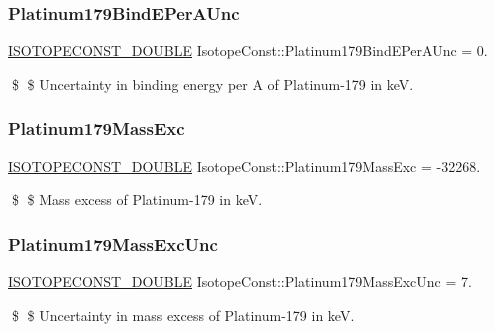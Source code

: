\subsubsection{\texorpdfstring{Platinum179\+Bind\+E\+Per\+A\+Unc}{Platinum179BindEPerAUnc}}
{\footnotesize\ttfamily \mbox{\hyperlink{group___isotope_const-_macros_ga8f45a7272ce02c0b4c65c44636ed719a}{I\+S\+O\+T\+O\+P\+E\+C\+O\+N\+S\+T\+\_\+\+D\+O\+U\+B\+LE}} Isotope\+Const\+::\+Platinum179\+Bind\+E\+Per\+A\+Unc = 0.}

\$ \$ Uncertainty in binding energy per A of Platinum-\/179 in keV. \mbox{\label{group___isotope_const-_platinum-_pt179_ga8328b830be411d72a7f9721fa7814ffa}} 
\subsubsection{\texorpdfstring{Platinum179\+Mass\+Exc}{Platinum179MassExc}}
{\footnotesize\ttfamily \mbox{\hyperlink{group___isotope_const-_macros_ga8f45a7272ce02c0b4c65c44636ed719a}{I\+S\+O\+T\+O\+P\+E\+C\+O\+N\+S\+T\+\_\+\+D\+O\+U\+B\+LE}} Isotope\+Const\+::\+Platinum179\+Mass\+Exc = -\/32268.}

\$ \$ Mass excess of Platinum-\/179 in keV. \mbox{\label{group___isotope_const-_platinum-_pt179_ga6c37fef50750f5f1d6f8f539da3bd9d8}} 
\subsubsection{\texorpdfstring{Platinum179\+Mass\+Exc\+Unc}{Platinum179MassExcUnc}}
{\footnotesize\ttfamily \mbox{\hyperlink{group___isotope_const-_macros_ga8f45a7272ce02c0b4c65c44636ed719a}{I\+S\+O\+T\+O\+P\+E\+C\+O\+N\+S\+T\+\_\+\+D\+O\+U\+B\+LE}} Isotope\+Const\+::\+Platinum179\+Mass\+Exc\+Unc = 7.}

\$ \$ Uncertainty in mass excess of Platinum-\/179 in keV. \mbox{\label{group___isotope_const-_platinum-_pt179_ga32ab93a6e0e6fab077e907c48a8ad853}} 
